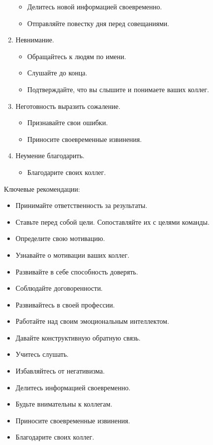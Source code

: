\documentclass[12pt,a4paper]{report}
\begin{document}
\begin{enumerate}
\begin{itemize}
		\item Делитесь новой информацией своевременно.
		\item Отправляйте повестку дня перед совещаниями.
	\end{itemize}
	\item Невнимание.
	\begin{itemize}
		\item Обращайтесь к людям по имени.
		\item Слушайте до конца.
		\item Подтверждайте, что вы слышите и понимаете ваших коллег.
	\end{itemize}
	\item Неготовность выразить сожаление.
	\begin{itemize}
		\item Признавайте свои ошибки.
		\item Приносите своевременные извинения.
	\end{itemize}
	\item Неумение благодарить.
	\begin{itemize}
		\item Благодарите своих коллег.
	\end{itemize}	
\end{enumerate}

\bigskip 
Ключевые рекомендации:
\begin{itemize}
	\item[\checkmark] Принимайте ответственность за результаты.
	\item[\checkmark] Ставьте перед собой цели. Сопоставляйте их с целями команды.
	\item[\checkmark] Определите свою мотивацию.
	\item[\checkmark] Узнавайте о мотивации ваших коллег.
	\item[\checkmark] Развивайте в себе способность доверять.
	\item[\checkmark] Соблюдайте договоренности.
	\item[\checkmark] Развивайтесь в своей профессии.
	\item[\checkmark] Работайте над своим эмоциональным интеллектом.
	\item[\checkmark] Давайте конструктивную обратную связь.
	\item[\checkmark] Учитесь слушать.
	\item[\checkmark] Избавляйтесь от негативизма.
	\item[\checkmark] Делитесь информацией своевременно.
	\item[\checkmark] Будьте внимательны к коллегам.
	\item[\checkmark] Приносите своевременные извинения.
	\item[\checkmark] Благодарите своих коллег.
\end{itemize}
\end{document}
